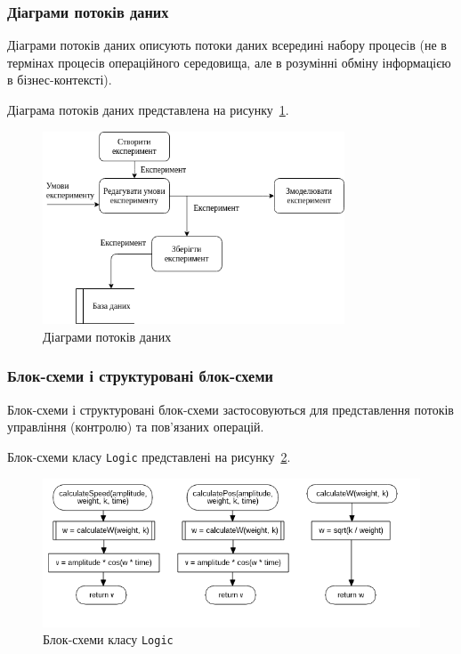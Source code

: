 \subsubsection{Діаграми потоків даних}
Діаграми потоків даних описують потоки даних всередині набору процесів (не в термінах процесів операційного середовища, але в розумінні обміну інформацією в бізнес-контексті).

Діаграма потоків даних представлена на рисунку~\ref{fig:dfd}.

\begin{figure}[H]
  \centering
    \includegraphics[width=0.8\textwidth]{dfd}
  \caption{Діаграми потоків даних}
  \label{fig:dfd}
\end{figure}

\subsubsection{Блок-схеми і структуровані блок-схеми}
Блок-схеми і структуровані блок-схеми застосовуються для представлення потоків управління (контролю) та пов'язаних операцій.

Блок-схеми класу \texttt{Logic} представлені на рисунку~\ref{fig:uml_flowchart_logic}.

\begin{figure}[H]
  \centering
    \includegraphics[width=1\textwidth]{uml_flowchart_logic}
  \caption{Блок-схеми класу \texttt{Logic}}
  \label{fig:uml_flowchart_logic}
\end{figure}

